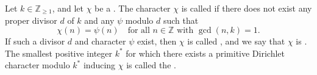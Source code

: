 \begin{definition} \label{definition:primitive_dirichlet_character}
Let $k \in \mathbb{Z}_{\geq 1}$, and let $\chi$ be a . The character $\chi$ is called  if there does not exist any proper divisor $d$ of $k$ and any  $\psi$ modulo $d$ such that
$$\chi(n) = \psi(n) \quad \text{for all } n \in \mathbb{Z} \text{ with } \gcd(n,k) = 1.$$
If such a divisor $d$ and character $\psi$ exist, then $\chi$ is called , and we say that $\chi$ is . The smallest positive integer $k^*$ for which there exists a primitive Dirichlet character modulo $k^*$ inducing $\chi$ is called the .
\end{definition}
